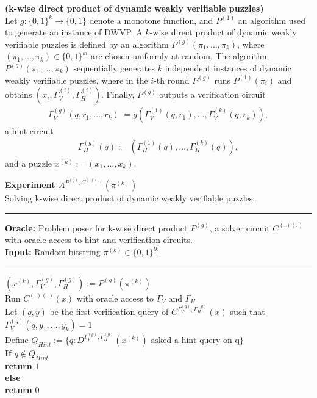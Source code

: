 %
%
%
\begin{definition}{\textbf{(k-wise direct product of dynamic weakly verifiable puzzles)}}\\
Let $g: \{0,1\}^{k} \rightarrow \{0,1\}$ denote a monotone function, and $P^{(1)}$ an algorithm used to generate an instance of DWVP.
A $k$-wise direct product of dynamic weakly verifiable puzzles is defined by an algorithm $P^{(g)}\left(\pi_1, \dots, \pi_k \right)$,
where $(\pi_1, \dots, \pi_k) \in \{0,1\}^{kl}$ are chosen uniformly at random.
The algorithm $P^{(g)}\left(\pi_1, \dots, \pi_k \right)$ sequentially generates $k$ independent instances of dynamic weakly verifiable puzzles,
where in the $i$-th round $P^{(g)}$ runs $P^{(1)}(\pi_i)$ and obtains $(x_i, \Gamma_V^{(i)}, \Gamma_H^{(i)} )$.
Finally, $P^{(g)}$ outputs a verification circuit
\begin{align*}
  \Gamma_V^{(g)} (q, r_1, \dots, r_k) := g(\Gamma_V^{(1)}(q, r_1), \dots, \Gamma_V^{(k)}(q, r_k)),
\end{align*}
a hint circuit
\begin{align*}
  \Gamma_H^{(g)} (q) := (\Gamma_H^{(1)}(q), \dots, \Gamma_H^{(k)}(q)),
\end{align*}
and a puzzle $x^{(k)} := (x_1, \dots, x_k)$.
\end{definition}
%
\begin{codeblock}
  \textbf{Experiment $A^{P^{(g)}, C^{(.) (.)}}(\pi^{(k)})$} \\
  Solving k-wise direct product of dynamic weakly verifiable puzzles.
  \medskip

  \hrule

  \medskip

  \textbf{Oracle:} Problem poser for k-wise direct product $P^{(g)}$, a solver circuit $C^{(.)(.)}$ with oracle access to hint and verification circuits. \\
  \textbf{Input:} Random bitstring $\pi^{(k)} \in \{0,1\}^{lk}$.\\

  \medskip\hrule\medskip

  $(x^{(k)}, \Gamma_V^{(g)}, \Gamma_H^{(g)}) := P^{(g)}(\pi^{(k)})$ \\
  Run $C^{(.)(.)}(x)$ with oracle access to $\Gamma_V$ and $\Gamma_H$ \\
  \IndI Let $(\widetilde{q},y)$ be the first verification query of $C^{\Gamma_V^{(g)}, \Gamma_H^{(g)}}(x)$ such that $\Gamma_V^{(g)}(\widetilde{q},y_1, \dots, y_k) = 1$ \\
  \IndI Define $Q_{Hint} := \{q: \text{$D^{\Gamma_V^{(g)}, \Gamma_H^{(g)}}(x^{(k)})$ asked a hint query on q} \}$\\
  \textbf{If} $q \notin Q_{Hint}$\\
  \IndI \textbf{return} $1$\\
  \textbf{else}\\
  \IndI \textbf{return} $0$\\

\end{codeblock}
